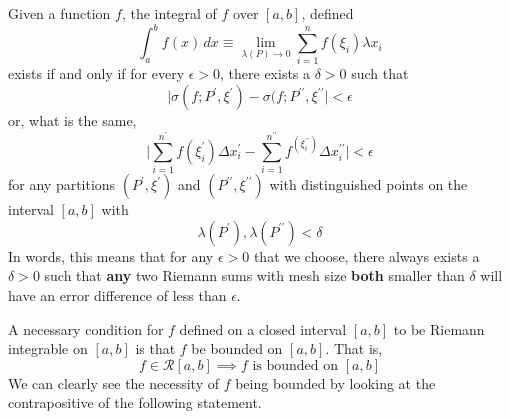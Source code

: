     \begin{lemma}
      Given a function $f$, the integral of $f$ over $[a, b]$, defined
      \[\int_a^b f(x)\,dx \equiv \lim_{\lambda(P) \rightarrow 0} \sum_{i=1}^n f(\xi_i) \lambda x_i\]
      exists if and only if for every $\epsilon>0$, there exists a $\delta>0$ such that 
      \[\big| \sigma(f; P^\prime, \xi^\prime) - \sigma(f; P^{\prime\prime}, \xi^{\prime\prime} \big| < \epsilon\]
      or, what is the same, 
      \[\Bigg| \sum_{i=1}^{n^\prime} f(\xi_i^\prime) \Delta x_i^\prime - \sum_{i=1}^{n^{\prime\prime}} f^(\xi_i^{\prime\prime}) \Delta x_i^{\prime\prime} \Bigg| < \epsilon\]
      for any partitions $(P^\prime, \xi^\prime)$ and $(P^{\prime\prime}, \xi^{\prime\prime})$ with distinguished points on the interval $[a, b]$ with
      \[\lambda(P^\prime), \lambda(P^{\prime\prime}) < \delta\]
      In words, this means that for any $\epsilon>0$ that we choose, there always exists a $\delta>0$ such that \textbf{any} two Riemann sums with mesh size \textbf{both} smaller than $\delta$ will have an error difference of less than $\epsilon$. 
    \end{lemma}

    \begin{theorem}
    A necessary condition for $f$ defined on a closed interval $[a, b]$ to be Riemann integrable on $[a, b]$ is that $f$ be bounded on $[a, b]$. That is, 
    \[f \in \mathcal{R}[a, b] \implies f \text{ is bounded on } [a, b]\]
    We can clearly see the necessity of $f$ being bounded by looking at the contrapositive of the following statement. 
    \end{theorem}

